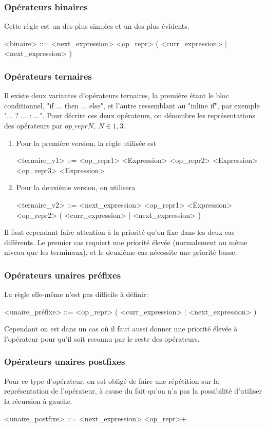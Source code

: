 \documentclass{article}
\begin{document}
\subsubsection{Opérateurs binaires}
Cette règle est un des plus simples et un des plus évidents.
\begin{grammar}
	<binaire> ::= <next\_expression> <op\_repr> ( <curr\_expression> | <next\_expression> )
\end{grammar}
\subsubsection{Opérateurs ternaires}
Il existe deux variantes d'opérateurs ternaires, la première étant le bloc conditionnel, "if ... then ... else", et l'autre ressemblant au "inline if", par exemple "... ? ... : ...". Pour décrire ces deux opérateurs, on dénombre les représentations des opérateurs par $op\_reprN, \ N \in {1, 3}$.
\begin{enumerate}
	\item Pour la première version, la règle utilisée est 
	\begin{grammar}
		<ternaire\_v1> ::= <op\_repr1> <Expression> <op\_repr2> <Expression> <op\_repr3> <Expression>
	\end{grammar}
	\item Pour la deuxième version, on utilisera
	\begin{grammar}
		<ternaire\_v2> ::= <next\_expression> <op\_repr1> <Expression> <op\_repr2> ( <curr\_expression> | <next\_expression> )
	\end{grammar}
\end{enumerate}
Il faut cependant faire attention à la priorité qu'on fixe dans les deux cas différents. Le premier cas requiert une priorité élevée (normalement au même niveau que les terminaux), et le deuxième cas nécessite une priorité basse.
\subsubsection{Opérateurs unaires préfixes}
La règle elle-même n'est pas difficile à définir:
\begin{grammar}
	<unaire\_préfixe> ::= <op\_repr> ( <curr\_expression> | <next\_expression> )
\end{grammar}
Cependant on est dans un cas où il faut aussi donner une priorité élevée à l'opérateur pour qu'il soit reconnu par le reste des opérateurs.
\subsubsection{Opérateurs unaires postfixes}
Pour ce type d'opérateur, on est obligé de faire une répétition sur la représentation de l'opérateur, à cause du fait qu'on n'a pas la possibilité d'utiliser la récursion à gauche.
\begin{grammar}
	<unaire\_postfixe> ::= <next\_expression> <op\_repr>+
\end{grammar}
\end{document}
